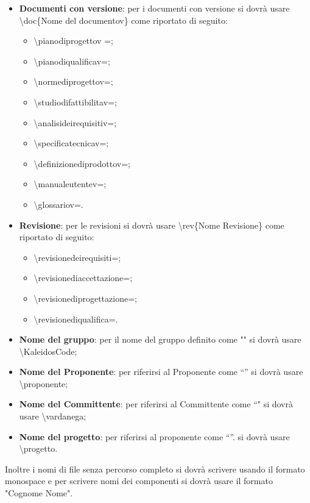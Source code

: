 \documentclass[../NormeDiProgetto.tex]{subfiles}
\begin{document}
\begin{itemize}
\begin{itemize}
					\end{itemize}	
				\item \textbf{Documenti con versione}: per i documenti con versione si dovrà usare \textbackslash doc\{Nome del documentov\} come riportato di seguito:
				\begin{itemize}
					\item \textbackslash pianodiprogettov =\pianodiprogettov ;
					\item \textbackslash pianodiqualificav=\pianodiqualificav ;
					\item \textbackslash normediprogettov=\normediprogettov ;
					\item \textbackslash studiodifattibilitav=\studiodifattibilitav ;
					\item \textbackslash analisideirequisitiv=\analisideirequisitiv ;
					\item \textbackslash specificatecnicav=\specificatecnicav ;
					\item \textbackslash definizionediprodottov= ;
					\item \textbackslash manualeutentev=\manualeutente ;
					\item \textbackslash glossariov=\glossariov .
				\end{itemize}	
				\item \textbf{Revisione}: per le revisioni si dovrà usare \textbackslash rev\{Nome Revisione\} come riportato di seguito:
					\begin{itemize}
						\item \textbackslash revisionedeirequisiti=\revisionedeirequisiti ;
						\item \textbackslash revisionediaccettazione=\revisionediaccettazione ;
						\item \textbackslash revisionediprogettazione=\revisionediprogettazione ;
						\item \textbackslash revisionediqualifica=\revisionediqualifica .
											
					\end{itemize}
				\item \textbf{Nome del gruppo}: per il nome del gruppo definito come "\kaleidoscode " si dovrà usare \textbackslash KaleidosCode;
				\item \textbf{Nome del Proponente}: per riferirsi al Proponente come 	“\proponente ” si dovrà usare \textbackslash proponente;	
				\item \textbf{Nome del Committente}: per riferirsi al Committente come “\vardanega "  si dovrà usare \textbackslash vardanega;
				\item \textbf{Nome del progetto}: per riferirsi al proponente come “\progetto ”. si dovrà usare \textbackslash progetto.
			\end{itemize}
		Inoltre i nomi di file senza percorso completo si dovrà scrivere usando il formato \gl monospace e per scrivere nomi dei componenti si dovrà usare il formato "Cognome Nome". 
		
\end{document}
